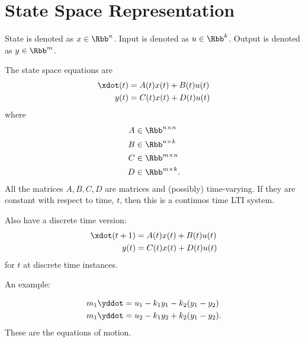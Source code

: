 \documentclass[10pt]{article}
\title{}
\author{}
\date{\today}
\begin{document}
\maketitle


\section{State Space Representation}
State is denoted as $x \in \Rbb^n$.
Input is denoted as $u \in \Rbb^k$.
Output is denoted as $y \in \Rbb^m$.

The state space equations are 
\begin{align}
  \xdot(t) &= A(t) x(t) + B(t)u(t)\\
  y(t)     &= C(t) x(t) + D(t)u(t)
\end{align}
where 
\begin{equation}
  \begin{split}
    A &\in \Rbb^{n\times n}\\
    B &\in \Rbb^{n\times k}\\
    C &\in \Rbb^{m\times n}\\
    D &\in \Rbb^{m\times k}.\\
  \end{split}
\end{equation}
All the matrices $ A,B,C,D$ are matrices and (possibly) time-varying.
If they are constant with respect to time, $t$, then this is a
continuos time LTI system.

Also have a discrete time version:
\begin{align}
  \xdot(t+1) &= A(t) x(t) + B(t)u(t)\\
  y(t)     &= C(t) x(t) + D(t)u(t)
\end{align}
for $t$ at discrete time instances.

An example:


\begin{equation}
  \begin{split}
    m_1\yddot &= u_1 - k_1y_1 - k_2(y_1 - y_2)\\
    m_1\yddot &= u_2 - k_1y_2 + k_2(y_1 - y_2).
  \end{split} %
\end{equation}
These are the equations of motion.
\end{document}
